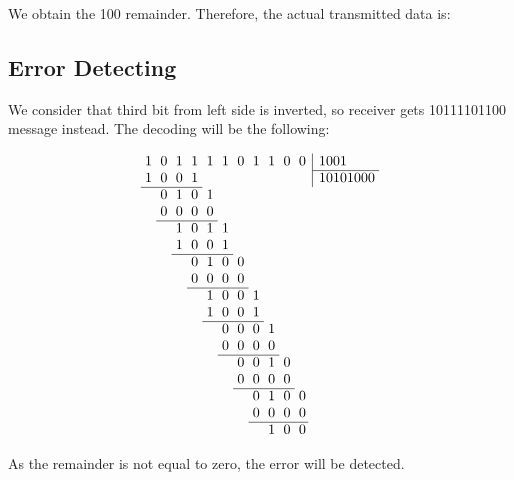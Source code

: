 \documentclass[12pt]{article}
\begin{document}
        We obtain the 100 remainder.
        Therefore, the actual transmitted data is:
        \begin{center}
        \end{center}

        \subsection{Error Detecting}
        We consider that third bit from left side is inverted, so receiver gets 10111101100 message instead.
        The decoding will be the following:

        \[\arraycolsep=0.3em
        \begin{array}{rrrrrrrrrrr@{\,}r|l}
            1 & 0 & 1 & 1 & 1 & 1 & 0 & 1 & 1 & 0 & 0 & & \,1001 \\
            \cline{13-10}
            1 & 0 & 0 & 1 &   &   &   &   &   &   &   & & \,10101000     \\
            \cline{1-4}
            & 0 & 1 & 0 & 1 \\
            & 0 & 0 & 0 & 0 \\
            \cline{2-5}
            & & 1 & 0 & 1 & 1 \\
            & & 1 & 0 & 0 & 1 \\
            \cline{3-6}
            & & & 0 & 1 & 0 & 0 \\
            & & & 0 & 0 & 0 & 0 \\
            \cline{4-7}
            & & & & 1 & 0 & 0 & 1 \\
            & & & & 1 & 0 & 0 & 1 \\
            \cline{5-8}
            & & & & & 0 & 0 & 0 & 1 \\
            & & & & & 0 & 0 & 0 & 0 \\
            \cline{6-9}
            & & & & & & 0 & 0 & 1 & 0 \\
            & & & & & & 0 & 0 & 0 & 0 \\
            \cline{7-10}
            & & & & & & & 0 & 1 & 0 & 0 \\
            & & & & & & & 0 & 0 & 0 & 0 \\
            \cline{8-11}
            & & & & & & & & 1 & 0 & 0
        \end{array}
        \]

        As the remainder is not equal to zero, the error will be detected.
    \newpage
\end{document}
